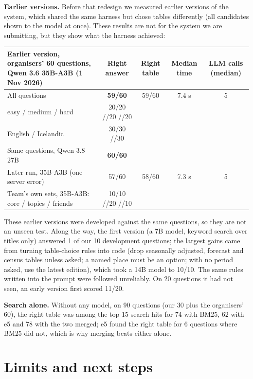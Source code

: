 \documentclass[10pt,a4paper]{article}
\begin{document}
\textbf{Earlier versions.} Before that redesign we measured earlier versions of the system, which shared the same
harness but chose tables differently (all candidates shown to the model at once). These results are not for the
system we are submitting, but they show what the harness achieved:

\begin{table}[h]
\centering
\small
\begin{tabularx}{\linewidth}{@{}Xcccc@{}}
\toprule
Earlier version, organisers' 60 questions, Qwen 3.6 35B-A3B (1 Nov 2026) & Right answer & Right table & Median time & LLM calls (median) \\
\midrule
All questions                         & \textbf{59/60} & 59/60 & 7.4 s & 5 \\
\quad easy / medium / hard            & 20/20 \;/\; 20/20 \;/\; 19/20 & & & \\
\quad English / Icelandic             & 30/30 \;/\; 29/30 & & & \\
Same questions, Qwen 3.8 27B          & \textbf{60/60} & & & \\
Later run, 35B-A3B (one server error)  & 57/60 & 58/60 & 7.3 s & 5 \\
\midrule
Team's own sets, 35B-A3B: core / topics / friends & 10/10 \;/\; 20/20 \;/\; 10/10 & & & \\
\bottomrule
\end{tabularx}
\end{table}

These earlier versions were developed against the same questions, so they are not an unseen test. Along the way,
the first version (a 7B model, keyword search over titles only) answered 1 of our 10 development questions; the
largest gains came from turning table-choice rules into code (drop seasonally adjusted, forecast and census tables
unless asked; a named place must be an option; with no period asked, use the latest edition), which took a 14B
model to 10/10. The same rules written into the prompt were followed unreliably. On 20 questions it had not seen,
an early version first scored 11/20.

\textbf{Search alone.} Without any model, on 90 questions (our 30 plus the organisers' 60), the right table was among
the top 15 search hits for 74 with BM25, 62 with e5 and 78 with the two merged; e5 found the right table for 6
questions where BM25 did not, which is why merging beats either alone.

\section*{Limits and next steps}
\end{document}
